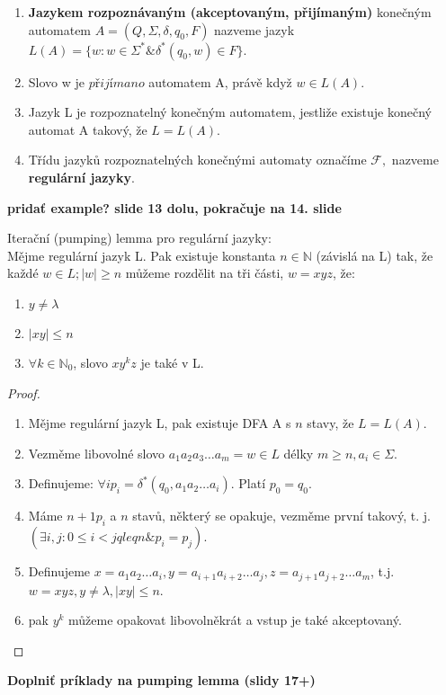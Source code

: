 \documentclass[../main.tex]{subfiles}
\begin{document}
\begin{definition}
    \begin{enumerate}
        \item \textbf{Jazykem rozpoznávaným (akceptovaným, přijímaným)} konečným automatem $A = (Q, \Sigma, \delta, q_0, F)$ nazveme jazyk
        $L(A) = \{ w : w \in \Sigma^* \& \delta^* (q_0,w) \in F\}$.
        \item Slovo w je $přijímano$ automatem A, právě když $w \in L(A)$.
        \item Jazyk L je rozpoznatelný konečným automatem, jestliže existuje konečný automat A takový, že $L = L(A)$.
        \item Třídu jazyků rozpoznatelných konečnými automaty označíme $\mathcal{F},$ nazveme \textbf{regulární jazyky}.
    \end{enumerate}

    \textbf{pridať example? slide 13 dolu, pokračuje na 14. slide}
\end{definition}

\begin{theorem}
    Iterační (pumping) lemma pro regulární jazyky:\\

    Mějme regulární jazyk L. Pak existuje konstanta $n \in \mathbb{N}$ (závislá na L) tak, že 
    každé $w \in L; |w| \geq n$ můžeme rozdělit na tři části, $w = xyz$, že:
    \begin{enumerate}
        \item $y \neq \lambda$
        \item $|xy| \leq n$
        \item $\forall k \in \mathbb{N}_0$, slovo $xy^kz$ je také v L.
    \end{enumerate}

    \begin{proof}
        \begin{enumerate}
            \item Mějme regulární jazyk L, pak existuje DFA A s $n$ stavy, že $L = L(A)$.
            \item Vezměme libovolné slovo $a_1 a_2 a_3 \dots a_m = w \in L$ délky $m \geq n, a_i \in \Sigma$.
            \item Definujeme: $\forall i p_i = \delta^* (q_0,a_1 a_2 \dots a_i).$ Platí $p_0 = q_0$.
            \item Máme $n+1 p_i$ a $n$ stavů, některý se opakuje, vezměme první takový, t. j. $(\exists i,j : 0 \leq i < j qleq n \& p_i = p_j)$.
            \item Definujeme $x = a_1 a_2 \dots a_i, y=a_{i+1}a_{i+2}\dots a_j, z = a_{j+1}a_{j+2}\dots a_{m}$, t.j.
            $w = xyz, y \neq \lambda, |xy| \leq n$.
            \item pak $y^k$ můžeme opakovat libovolněkrát a vstup je také akceptovaný.
        \end{enumerate}
    \end{proof}

\end{theorem}
\begin{example}
    \textbf{Doplniť príklady na pumping lemma (slidy 17+)}
\end{example}
\end{document}
